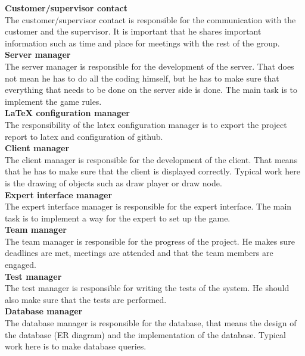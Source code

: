 \noindent\textbf{Customer/supervisor contact}\\ %
The customer/supervisor contact is responsible for the communication with the 
customer and the supervisor. It is important that he shares important 
information such as time and place for meetings with the rest of the group.
\\\newline
\textbf{Server manager}\\
The server manager is responsible for the development of the server. That does 
not mean he has to do all the coding himself, but he has to make sure that 
everything that needs to be done on the server side is done. The main task is 
to implement the game rules.
\\\newline
\textbf{LaTeX configuration manager}\\
The responsibility of the latex configuration manager is to export the project 
report to latex and configuration of github.
\\\newline
\textbf{Client manager}\\
The client manager is responsible for the development of the client. That means 
that he has to make sure that the client is displayed correctly. Typical work 
here is the drawing of objects such as draw player or draw node. 
\\\newline
\textbf{Expert interface manager}\\
The expert interface manager is responsible for the expert interface. The main task is to implement a way for the 
expert to set up the game.
\\\newline
\textbf{Team manager}\\
The team manager is responsible for the progress of the project. He makes sure 
deadlines are met, meetings are attended and that the team members are engaged.
\\\newline
\textbf{Test manager}\\
The test manager is responsible for writing the tests of the system. He should 
also make sure that the tests are performed.
\\\newline
\textbf{Database manager}\\
The database manager is responsible for the database, that means the design of the database (ER diagram) and the implementation of the database. Typical work here is to make database queries. 
